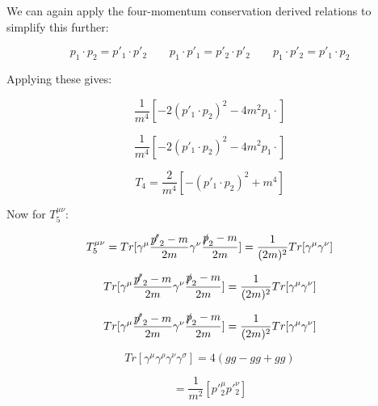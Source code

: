 \documentclass[a4]{article}
\begin{document}
    We can again apply the four-momentum conservation derived relations to simplify this further:

    \begin{equation}
        p_1 \cdot p_2 = p'_1 \cdot p'_2 \qquad p_1 \cdot p'_1 = p'_2 \cdot p'_2 \qquad p_1 \cdot p'_2 = p'_1 \cdot p_2
    \end{equation}

    Applying these gives:

    \begin{equation}
        \frac{1}{m^4} [- 2 (p'_1 \cdot p_2)^2 - 4 m^2 p_1 \cdot]
    \end{equation}

    \begin{equation}
        \frac{1}{m^4} [- 2 (p'_1 \cdot p_2)^2 - 4 m^2 p_1 \cdot]
    \end{equation}

    \begin{framed}
        \begin{equation}
            T_4 = \frac{2}{m^4} [- (p'_1 \cdot p_2)^2 + m^4]
        \end{equation}
    \end{framed}

    Now for $T^{\mu \nu}_5$:

    \begin{equation}
        T_5^{\mu \nu} = Tr [\gamma^\mu \frac{\slashed{p'}_2 - m}{2m} \gamma^\nu \frac{\slashed{p}_2 - m}{2 m}] = \frac{1}{(2m)^2} Tr[\gamma^\mu \gamma^\nu]
    \end{equation}

    \begin{equation}
        Tr [\gamma^\mu \frac{\slashed{p'}_2 - m}{2m} \gamma^\nu \frac{\slashed{p}_2 - m}{2 m}] = \frac{1}{(2m)^2} Tr[\gamma^\mu \gamma^\nu]
    \end{equation}

    \begin{equation}
        Tr [\gamma^\mu \frac{\slashed{p'}_2 - m}{2m} \gamma^\nu \frac{\slashed{p}_2 - m}{2 m}] = \frac{1}{(2m)^2} Tr[\gamma^\mu \gamma^\nu]
    \end{equation}

    \begin{equation}
        Tr [\gamma^\mu \gamma^\rho \gamma^\nu \gamma^\sigma] = 4(g g - g g + g g)
    \end{equation}

    \begin{equation}
        = \frac{1}{m^2} [p'^{\mu}_2 p'^{\nu}_2]
    \end{equation}
\end{document}
